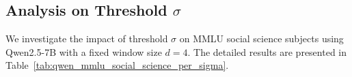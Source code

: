 \clearpage
\subsection{Analysis on Threshold $\sigma$}
We investigate the impact of threshold $\sigma$ on MMLU social science subjects using Qwen2.5-7B with a fixed window size $d=4$.
The detailed results are presented in Table~\ref{tab:qwen_mmlu_social_science_per_sigma}.



